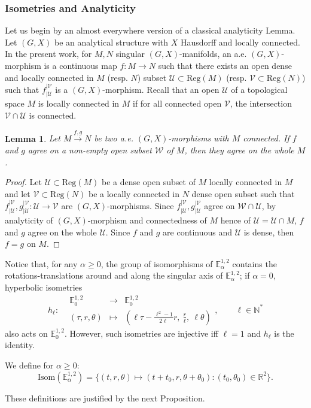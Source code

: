 \documentclass[a4paper,12pt]{article}
\def\U{\mathcal U}
\def\isom{Isom}
\def\V{\mathcal V}
\def\E{\mathbf E}
\def\N{\mathbb N}
\def\E{\mathbb{E}}
\def\RR{\mathbb{R}}
\newcommand{\mass}[1]{{\mathbb E}^{1,2}_{#1}}
\def\isom{\mathrm{Isom}}
\def\Reg{\mathrm{Reg}}
\def\reg{\Reg}
\newcommand{\fonction}[5]{\displaystyle#1:\begin{array}{l|rcl}
& \displaystyle #2 & \longrightarrow & \displaystyle #3 \\
    & \displaystyle #4 & \longmapsto & \displaystyle #5 \end{array}}
\newtheorem{lemou}{Lemma}[section]          %
\begin{document}
\subsubsection{Isometries and Analyticity} \label{sec:isometries}
Let us begin by an almost everywhere version of a classical analyticity Lem\-ma.
Let $(G,X)$ be an analytical structure with $X$ Hausdorff and locally connected.
In the present work, for $M,N$ singular $(G,X)$-manifolds,  an a.e. $(G,X)$-morphism is a continuous map $f:M\rightarrow N$ such that there exists an open dense and locally connected in $M$ (resp. $N$) subset $\U\subset \reg(M)$ (resp. $\V\subset \reg(N)$) such that $f_{|\U}^{|\V}$ is a $(G,X)$-morphism. Recall that an open $\U$ of a topological space $M$ is locally connected in $M$ if for all connected open $\V$, the intersection $\V\cap \U$ is connected.

\begin{lemou} \label{lem:liouville} Let $M \xrightarrow{f,g} N$ be two a.e. $(G,X)$-morphisms with $M$ connected. If $f$ and $g$ agree on a non-empty open subset $\mathcal W$ of $M$, then they agree on the whole $M$.
\end{lemou}
\begin{proof}
Let $\U\subset \reg(M)$ be a dense open subset of $M$ locally connected in $M$  and let $\V\subset \reg(N)$ be a locally connected in $N$ dense open subset such that $f_{|\U}^{|\V},g_{|\U}^{|\V}: \U\rightarrow \V$ are $(G,X)$-morphisms. Since $f_{|\U}^{|\V},g_{|\U}^{|\V}$ agree on $\mathcal W\cap \U$, by analyticity of $(G,X)$-morphism and connectedness of $M $ hence of $\U=\U\cap M$, $f$ and $g$ agree on the whole $\U$. Since $f$ and $g$ are continuous and $\U$ is dense, then $f=g$ on $M$.
\end{proof}

 Notice that, for any $\alpha\geq 0$, the group of isomorphisms of $\mass{\alpha}$ contains the rotations-translations around and along the singular axis of $\mass{\alpha}$; 
if $\alpha=0$, hyperbolic isometries 
$$\fonction{h_\ell}{\mass{0}}{\mass{0}}{(\tau,r,\theta)}{\left(\ell \tau - \frac{\ell^2-1}{2\ell}r,\ \frac{r}{\ell},\  \ell\theta\right)},\quad\quad \ell \in \N^*$$
also acts on $\mass{0}$. However, such isometries are injective iff $\ell=1$ and $h_\ell$ is the identity. 

We define for $\alpha\geq 0$:
$$\isom(\E^{1,2}_\alpha) = \{(t,r,\theta)\mapsto (t+t_0,r,\theta+\theta_0): (t_0,\theta_0) \in \RR^2\}.$$

These definitions are justified by the next Proposition.
\end{document}
